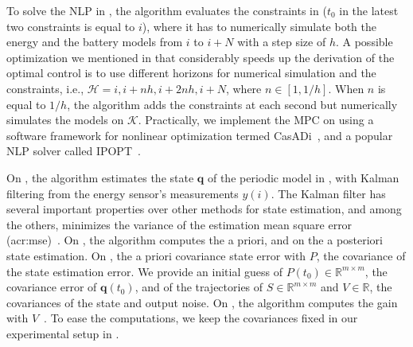 To solve the NLP in , the algorithm evaluates the constraints in  ($t_0$ in the latest two constraints is equal to $i$), where it has to numerically simulate both the energy and the battery models from $i$ to $i+N$ with a step size of $h$. A possible optimization we mentioned in  that considerably speeds up the derivation of the optimal control is to use different horizons for numerical simulation and the constraints, i.e., $\mathcal{H}={i,i+nh,i+2nh,i+N}$, where $n\in[1,1/h]$. When $n$ is equal to $1/h$, the algorithm adds the constraints at each second but numerically simulates the models on $\mathcal{K}$. 
Practically, we implement the MPC on  using a software framework for nonlinear optimization termed CasADi~\citep{andersson2012casadi,andersson2012bcasadi,andersson2019casadi}, and a popular NLP solver called IPOPT~\citep{wachter2006implementation}.

On , the algorithm estimates the state $\mathbf{q}$ of the periodic model in , with Kalman filtering from the energy sensor's measurements $y(i)$. The Kalman filter has several important properties over other methods for state estimation, and among the others, minimizes the variance of the estimation mean square error (\Gls{acr:mse})~\citep{kalman1960new,simon2006optimal,jwo2007practical}. On , the algorithm computes the a priori, and on  the a posteriori state estimation. On , the a priori covariance state error with $P$, the covariance of the state estimation error. We provide an initial guess of $P(t_0)\in\mathbb{R}^{m\times m}$, the covariance error of $\mathbf{q}(t_0)$, and of the trajectories of $S\in\mathbb{R}^{m\times m}$ and $V\in\mathbb{R}$, the covariances of the state and output noise. On , the algorithm computes the gain with $V$~\citep{simon2006optimal}. To ease the computations, we keep the covariances fixed in our experimental setup in .

